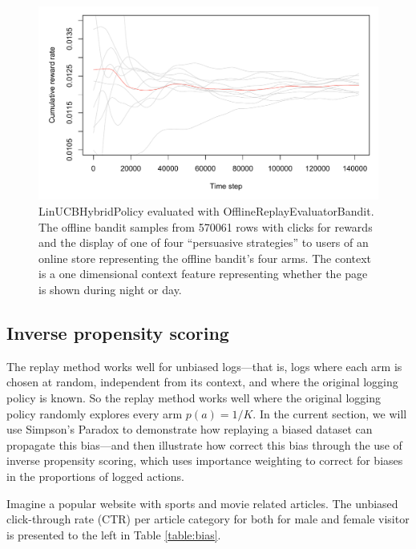 \documentclass{jss}
\begin{document}
\begin{figure}[H]
  \centering
    \includegraphics[width=.99\textwidth]{fig/offline_bandit}

      \caption{LinUCBHybridPolicy evaluated with OfflineReplayEvaluatorBandit. The offline bandit samples from 570061 rows with clicks for rewards and the display of one of four “persuasive strategies” to users of an online store representing the offline bandit's four arms. The context is a one dimensional context feature representing whether the page is shown during night or day. }
      \label{fig:offline_bandit}
\end{figure}


\subsection{Inverse propensity scoring} \label{prop}

The replay method works well for unbiased logs---that is, logs where each arm is chosen at random, independent from its context, and where the original logging policy is known. So the replay method works well where the original logging policy randomly explores every arm $p(a) = 1/K$. In the current section, we will use Simpson's Paradox to demonstrate how replaying a biased dataset can propagate this bias---and then illustrate how correct this bias through the use of inverse propensity scoring, which uses importance weighting to correct for biases in the proportions of logged actions.

Imagine a popular website with sports and movie related articles. The unbiased click-through rate (CTR) per article category for both for male and female visitor is presented to the left in Table \ref{table:bias}.
\end{document}
